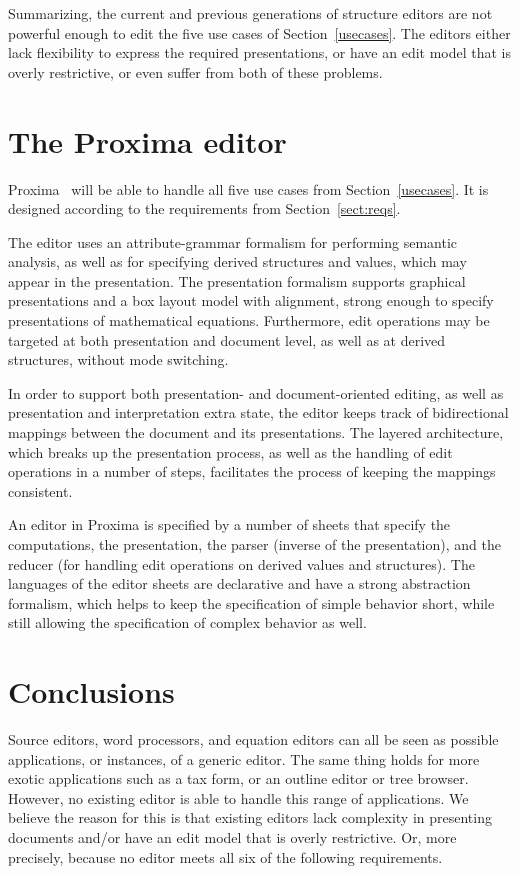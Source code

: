\documentclass{speauth}
\begin{document}
Summarizing, the current and previous generations of structure editors are not powerful enough to edit the five use cases of Section~\ref{usecases}. The editors either lack flexibility to express the required presentations, or have an edit model that is overly restrictive, or even suffer from both of these problems. 

\section{The Proxima editor}\label{sect:proxEditor}

Proxima~\cite{proximaarch} will be able to handle all five use cases from Section~\ref{usecases}. It is designed according to the requirements from Section~\ref{sect:reqs}.

The editor uses an attribute-grammar formalism for performing semantic analysis, as well as for specifying derived structures and values, which may appear in the presentation. The presentation formalism supports graphical presentations and a box layout model with alignment, strong enough to specify presentations of mathematical equations. Furthermore, edit operations may be targeted at both presentation and document level, as well as at derived structures, without mode switching.

In order to support both presentation- and document-oriented editing, as well as presentation and interpretation extra state, the editor keeps track of bidirectional mappings between the document and its presentations. The layered architecture, which breaks up the presentation process, as well as the handling of edit operations in a number of steps, facilitates the process of keeping the mappings consistent. 


An editor in Proxima is specified by a number of sheets that specify the computations, the presentation, the parser (inverse of the presentation), and the reducer (for handling edit operations on derived values and structures). The languages of the editor sheets are declarative and have a strong abstraction formalism, which helps to keep the specification of simple behavior short, while still allowing the specification of complex behavior as well.

\section{Conclusions}
\label{conclusions}
Source editors, word processors, and equation editors can all be seen as possible applications, or instances, of a generic editor.  The same thing holds for more exotic applications such as a tax form, or an outline editor or tree browser. However, no existing editor is able to handle this range of applications. We believe the reason for this is that existing editors lack complexity in presenting documents and/or have an edit model that is overly restrictive. Or, more precisely, because no editor meets all six of the following requirements.
\end{document}
